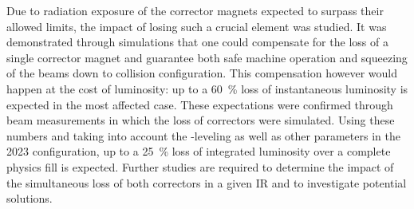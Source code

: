 Due to radiation exposure of the corrector magnets expected to surpass their allowed limits, the impact of losing such a crucial element was studied.
It was demonstrated through simulations that one could compensate for the loss of a single corrector magnet and guarantee both safe machine operation and squeezing of the beams down to collision configuration.
This compensation however would happen at the cost of luminosity: up to a \qty{60}{\percent} loss of instantaneous luminosity is expected in the most affected case.
These expectations were confirmed through beam measurements in which the loss of correctors were simulated.
Using these numbers and taking into account the -leveling as well as other parameters in the \num{2023} configuration, up to a \qty{25}{\percent} loss of integrated luminosity over a complete physics fill is expected.
Further studies are required to determine the impact of the simultaneous loss of both correctors in a given \gls{IR} and to investigate potential solutions.






\glsresetall                                     %
